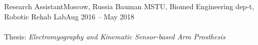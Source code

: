 \resumeSubheading
{Research Assistant}{Moscow, Russia}
{Bauman MSTU, Biomed Engineering dep-t, Robotic Rehab Lab}{Aug 2016 -- May 2018}
{\ \ \ \\}\\
{Thesis: \textit{Electromyography and Kinematic Sensor-based Arm Prosthesis}}